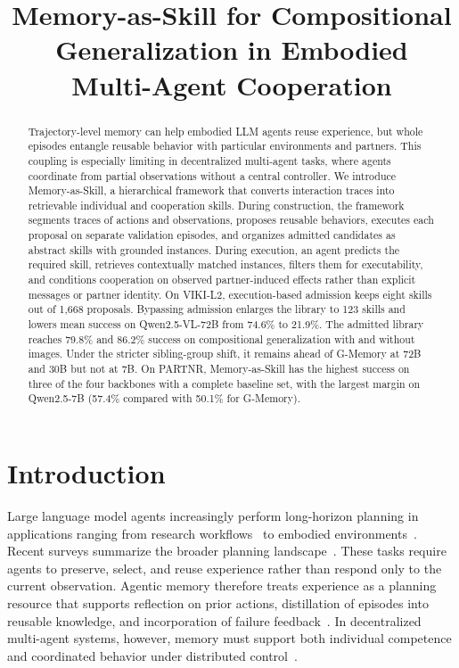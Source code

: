 \documentclass{article}
\title{Memory-as-Skill for Compositional\\Generalization in Embodied\\Multi-Agent Cooperation}
\author{}
\theoremstyle{plain}
\theoremstyle{definition}
\theoremstyle{remark}
\begin{document}
 
 
\maketitle
 
 
\begin{abstract}
  Trajectory-level memory can help embodied LLM agents reuse experience, but whole episodes entangle reusable behavior with particular environments and partners. This coupling is especially limiting in decentralized multi-agent tasks, where agents coordinate from partial observations without a central controller. We introduce Memory-as-Skill, a hierarchical framework that converts interaction traces into retrievable individual and cooperation skills. During construction, the framework segments traces of actions and observations, proposes reusable behaviors, executes each proposal on separate validation episodes, and organizes admitted candidates as abstract skills with grounded instances. During execution, an agent predicts the required skill, retrieves contextually matched instances, filters them for executability, and conditions cooperation on observed partner-induced effects rather than explicit messages or partner identity. On VIKI-L2, execution-based admission keeps eight skills out of 1{,}668 proposals. Bypassing admission enlarges the library to 123 skills and lowers mean success on Qwen2.5-VL-72B from 74.6\% to 21.9\%. The admitted library reaches 79.8\% and 86.2\% success on compositional generalization with and without images. Under the stricter sibling-group shift, it remains ahead of G-Memory at 72B and 30B but not at 7B. On PARTNR, Memory-as-Skill has the highest success on three of the four backbones with a complete baseline set, with the largest margin on Qwen2.5-7B (57.4\% compared with 50.1\% for G-Memory).
\end{abstract}

\raggedbottom
 
\section{Introduction}
\label{sec:intro}
 
Large language model agents increasingly perform long-horizon planning in applications ranging from research workflows~\citep{zheng2025deepresearcher} to embodied environments~\citep{ahn2022can,erdogan2025plan}. Recent surveys summarize the broader planning landscape~\citep{aghzal2025survey,cao2025large}. These tasks require agents to preserve, select, and reuse experience rather than respond only to the current observation. Agentic memory therefore treats experience as a planning resource that supports reflection on prior actions, distillation of episodes into reusable knowledge, and incorporation of failure feedback~\citep{zhang2024survey,xu2025mem,shinn2024reflexion}. In decentralized multi-agent systems, however, memory must support both individual competence and coordinated behavior under distributed control~\citep{dorigo2021swarm,zhang2018fully}.
 
\end{document}
